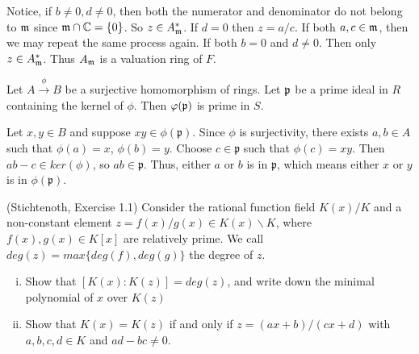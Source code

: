 \begin{solution}
	Notice, if $b\neq 0, d \neq 0$, then both the numerator and denominator 
	do not belong to
	$\mathfrak{m}$ since $\mathfrak{m} \cap \mathbb{C} = \lbrace 0 \rbrace$. So $z \in A_{\mathfrak{m}}^*$.
	If $d = 0$ then $z = a/c$. If both $a,c\in \mathfrak{m}$, then we
	may repeat the same process again. If both $b = 0$ and $d \neq 0$. 
	Then only $z \in A_{\mathfrak{m}}^*$. Thus $A_{\mathfrak{m}} $ is a valuation ring of $F$.
\end{solution}

\begin{exercise} \label{primeontoprime}
	Let $A \stackrel{\phi}{\longrightarrow} B$ be a surjective homomorphism of rings. 
	Let $\mathfrak{p} $ be a prime ideal in $R$ containing the kernel of $\phi$. 
	Then $\varphi(\mathfrak{p})$ is prime in $S$.
\end{exercise}

\begin{solution} 
	Let $x,y \in B$ and suppose $xy \in \phi(\mathfrak{p})$. Since $\phi$ is 
	surjectivity, there exists $a, b \in A$ such that $\phi(a)= x$, $\phi(b)=y$. 
	Choose $c \in \mathfrak{p}$ such that $\phi(c) = xy$.  
	Then $ab -c \in ker(\phi)$, so $ab \in \mathfrak{p}$.  
	Thus, either $a$ or $b$ is in $\mathfrak{p}$, which means 
	either $x$ or $y$ is in $\phi(\mathfrak{p})$.
\end{solution}

    
\begin{exercise}(Stichtenoth, Exercise 1.1)
	Consider the rational function field $K(x)/K$ and a non-constant element 
	$z = f(x)/g(x) \in K(x) \backslash K$, where $f(x),g(x) \in K[x]$ are 
	relatively prime. We call $deg(z) = max \lbrace deg(f) , deg(g) \rbrace $ 
	the degree of $z$.
	\begin{enumerate}[(i)]
		\item Show that $[K(x): K(z)] = deg(z)$, and write down the minimal 
		polynomial of $x$ over $K(z)$
		\item Show that $K(x)=K(z) $ if and only if $z = (ax+b)/(cx+d)$ with
		$a,b,c,d \in K$ and $ad - bc \neq 0$.
	\end{enumerate}
\end{exercise}

